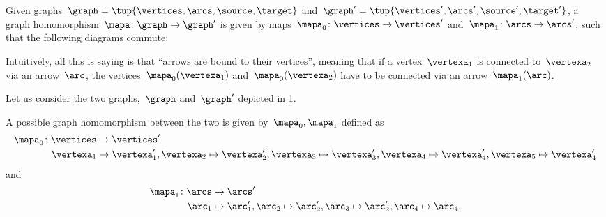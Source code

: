

\section{}

\begin{definition}
    \label{def:graph_homom}
    Given graphs~$\graph=\tup{\vertices,\arcs,\source,\target}$ and~$\graph'=\tup{\vertices',\arcs',\source',\target'}$, a graph homomorphism~$\mapa \colon \graph \to \graph'$ is given by maps~$\mapa_0\colon \vertices \to \vertices'$ and~$\mapa_1\colon \arcs \to \arcs'$, such that the following diagrams commute:
    \begin{center}
    \end{center}
\end{definition}
\begin{remark}
    Intuitively, all this is saying is that ``arrows are bound to their vertices'', meaning that if a vertex~$\vertexa_1$ is connected to~$\vertexa_2$ via an arrow~$\arc$, the vertices~$\mapa_0(\vertexa_1)$ and~$\mapa_0(\vertexa_2)$ have to be connected via an arrow~$\mapa_1(\arc)$.
\end{remark}

\begin{example}
    \label{exa:homomorphism_graph_positive}
    Let us consider the two graphs,~$\graph$ and~$\graph'$ depicted in \cref{fig:ex_graph_homom}.
    \begin{figure}[h]
        \begin{center}
        \end{center}
        \caption{\label{fig:ex_graph_homom}}
    \end{figure}
    A possible graph homomorphism between the two is given by~$\mapa_0,\mapa_1$ defined as
    \begin{equation*}
        \begin{aligned}
            \mapa_0\colon \vertices &\to \vertices'\\
            \vertexa_1&\mapsto \vertexa_1',
            \vertexa_2\mapsto \vertexa_2',
            \vertexa_3\mapsto \vertexa_3',
            \vertexa_4\mapsto \vertexa_4',
            \vertexa_5\mapsto \vertexa_4'
        \end{aligned}
    \end{equation*}
    and
    \begin{equation*}
        \begin{aligned}
            \mapa_1\colon \arcs &\to \arcs'\\
            \arc_1&\mapsto \arc_1',
            \arc_2\mapsto \arc_2',
            \arc_3\mapsto \arc_2',
            \arc_4\mapsto \arc_4.
        \end{aligned}
    \end{equation*}
\end{example}

